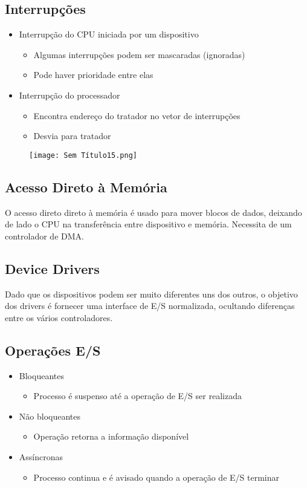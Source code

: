 \documentclass[10pt,a4paper]{report}
\begin{document}
\subsection{Interrupções}
\begin{itemize}
\item Interrupção do CPU iniciada por um dispositivo
\begin{itemize}
\item Algumas interrupções podem ser mascaradas (ignoradas)
\item Pode haver prioridade entre elas
\end{itemize}
\item Interrupção do processador~\begin{itemize}
\item Encontra endereço do tratador no vetor de interrupções
\item Desvia para tratador
\end{itemize}
\end{itemize}
\begin{figure}[H]
\centering
\texttt{[image: Sem Título15.png]}
\end{figure}
\subsection{Acesso Direto à Memória}
O acesso direto direto à memória é usado para mover blocos de dados, deixando de lado o CPU na transferência entre dispositivo e memória. Necessita de um controlador de DMA.
\subsection{Device Drivers}
Dado que os dispositivos podem ser muito diferentes uns dos outros, o objetivo dos drivers é fornecer uma interface de E/S normalizada, ocultando diferenças entre os vários controladores.
\subsection{Operações E/S}
\begin{itemize}
\item Bloqueantes
\begin{itemize}
\item Processo é suspenso até a operação de E/S ser realizada
\end{itemize}
\item Não bloqueantes
\begin{itemize}
\item Operação retorna a informação disponível
\end{itemize}
\item Assíncronas
\begin{itemize}
\item Processo continua e é avisado quando a operação de E/S terminar
\end{itemize}
\end{itemize}
\end{document}
